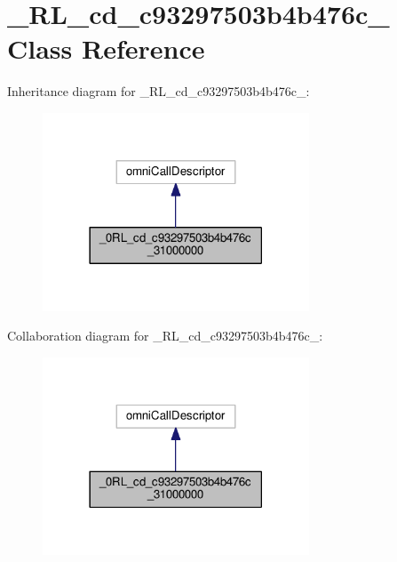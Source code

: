 \hypertarget{class__0_r_l__cd__c93297503b4b476c__31000000}{}\section{\+\_\+R\+L\+\_\+cd\+\_\+c93297503b4b476c\+\_ Class Reference}
\label{class__0_r_l__cd__c93297503b4b476c__31000000}


Inheritance diagram for \+\_\+R\+L\+\_\+cd\+\_\+c93297503b4b476c\+\_\+:
\nopagebreak
\begin{figure}[H]
\begin{center}
\leavevmode
\includegraphics[width=225pt]{class__0_r_l__cd__c93297503b4b476c__31000000__inherit__graph}
\end{center}
\end{figure}


Collaboration diagram for \+\_\+R\+L\+\_\+cd\+\_\+c93297503b4b476c\+\_\+:
\nopagebreak
\begin{figure}[H]
\begin{center}
\leavevmode
\includegraphics[width=225pt]{class__0_r_l__cd__c93297503b4b476c__31000000__coll__graph}
\end{center}
\end{figure}
